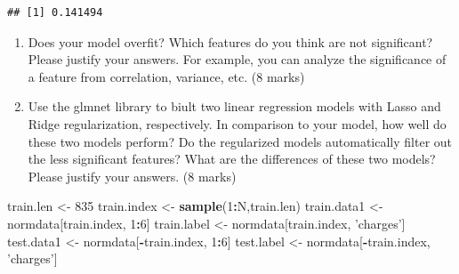 \documentclass[
]{article}
\newenvironment{Shaded}{\begin{snugshade}}{\end{snugshade}}
\newcommand{\DecValTok}[1]{\textcolor[rgb]{0.00,0.00,0.81}{#1}}
\newcommand{\KeywordTok}[1]{\textcolor[rgb]{0.13,0.29,0.53}{\textbf{#1}}}
\newcommand{\NormalTok}[1]{#1}
\newcommand{\OperatorTok}[1]{\textcolor[rgb]{0.81,0.36,0.00}{\textbf{#1}}}
\newcommand{\StringTok}[1]{\textcolor[rgb]{0.31,0.60,0.02}{#1}}
\begin{document}
\begin{verbatim}
## [1] 0.141494
\end{verbatim}

\begin{enumerate}
\def\labelenumi{\arabic{enumi}.}
\setcounter{enumi}{4}
\item
  Does your model overfit? Which features do you think are not
  significant? Please justify your answers. For example, you can analyze
  the significance of a feature from correlation, variance, etc. (8
  marks)
\item
  Use the glmnet library to biult two linear regression models with
  Lasso and Ridge regularization, respectively. In comparison to your
  model, how well do these two models perform? Do the regularized models
  automatically filter out the less significant features? What are the
  differences of these two models? Please justify your answers. (8
  marks)
\end{enumerate}

\begin{Shaded}
\begin{Highlighting}[]
\NormalTok{train.len <-}\StringTok{ }\DecValTok{835}
\NormalTok{train.index <-}\StringTok{ }\KeywordTok{sample}\NormalTok{(}\DecValTok{1}\OperatorTok{:}\NormalTok{N,train.len)}
\NormalTok{train.data1 <-}\StringTok{ }\NormalTok{normdata[train.index,  }\DecValTok{1}\OperatorTok{:}\DecValTok{6}\NormalTok{]}
\NormalTok{train.label <-}\StringTok{ }\NormalTok{normdata[train.index, }\StringTok{'charges'}\NormalTok{]}
\NormalTok{test.data1 <-}\StringTok{ }\NormalTok{normdata[}\OperatorTok{-}\NormalTok{train.index, }\DecValTok{1}\OperatorTok{:}\DecValTok{6}\NormalTok{]}
\NormalTok{test.label <-}\StringTok{ }\NormalTok{normdata[}\OperatorTok{-}\NormalTok{train.index, }\StringTok{'charges'}\NormalTok{]}
\end{Highlighting}
\end{Shaded}
\end{document}
